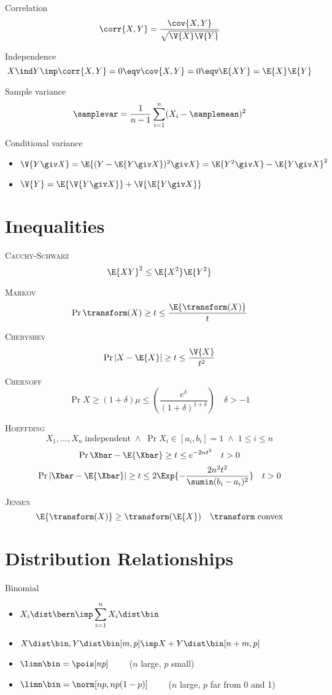 \documentclass[landscape]{article}
\begin{document}
\begin{multicols*}{2}
Correlation
\[\corr{X,Y} = \displaystyle\frac{\cov{X,Y}}{\sqrt{\V{X}\V{Y}}}\]

Independence
\[X\ind Y \imp \corr{X,Y} = 0 \eqv \cov{X,Y} = 0 \eqv \E{XY}=\E{X}\E{Y}\]

Sample variance
\[\samplevar = \frac{1}{n-1}\sum_{i=1}^n(X_i-\samplemean)^2\]

Conditional variance
\begin{itemize}
  \item $\V{Y\giv X} = \E{(Y-\E{Y\giv X})^2\giv X} =\E{Y^2\giv X}-\E{Y\giv X}^2$
  \item $\V{Y} = \E{\V{Y\giv X}}+\V{\E{Y\giv X}}$
\end{itemize}

\section{Inequalities}

\textsc{Cauchy-Schwarz}
\[\E{XY}^2 \le \E{X^2}\E{Y^2}\]

\textsc{Markov}
\[\Pr{\transform(X) \ge t}\le\frac{\E{\transform(X)}}{t}\]

\textsc{Chebyshev}
\[\Pr{\lvert X-\E{X}\rvert \ge t} \le \frac{\V{X}}{t^2}\]

\textsc{Chernoff}
\[\Pr{X \ge (1+\delta)\mu}
\le \left(\frac{e^\delta}{(1+\delta)^{1+\delta}}\right) \quad \delta>-1\]

\textsc{Hoeffding}
\[X_1,\ldots,X_n \; \textrm{independent}
\;\wedge\; \Pr{X_i\in[a_i,b_i]} = 1 \;\wedge\; 1 \le i \le n \]
\[\Pr{\Xbar-\E{\Xbar} \ge t} \le e^{-2nt^2} \quad t>0 \]
\[\Pr{|\Xbar-\E{\Xbar}| \ge t} \le 2\Exp{-\frac{2n^2t^2}{\sumin(b_i-a_i)^2}}
\quad t>0\]

\textsc{Jensen}\label{jensen}
\[\E{\transform(X)} \ge \transform(\E{X}) \quad
  \transform \text{ convex}\]

\section{Distribution Relationships}

Binomial
\begin{itemize}
  \item $X_i \dist \bern \imp \displaystyle\sum_{i=1}^n X_i \dist \bin$
  \item $X\dist\bin, Y\dist\bin[m,p] \imp X+Y\dist\bin[n+m,p]$
  \item $\limn\bin = \pois[np] \qquad$ ($n$ large, $p$ small)
  \item $\limn\bin = \norm[np,np(1-p)] \qquad$
    ($n$ large, $p$ far from 0 and 1)
\end{itemize}


\end{multicols*}
\end{document}
